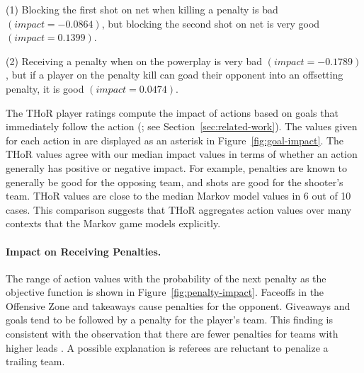 \documentclass[]{article}
\begin{document}
 (1) Blocking the first shot on net when killing a penalty is bad $(impact=-0.0864)$, but blocking the second shot on net is very good $(impact=0.1399)$.

 (2) Receiving a penalty when on the powerplay is very bad $(impact=-0.1789)$, but if a player on the penalty kill can goad their opponent into an offsetting penalty, it is good $(impact=0.0474)$.

The THoR player ratings compute the impact of actions based on goals that immediately follow the action (\citep{Lock2009,Schuckers2011}; see Section~\ref{sec:related-work}). The values given for each action in \citep{Lock2009} are displayed as an asterisk in Figure~\ref{fig:goal-impact}.
%
The THoR values
agree with our median impact values in terms of whether an action generally has positive or negative impact. For example, penalties are known to generally be good for the opposing team, and shots are good for the shooter's team. THoR values are close to the median Markov model values in 6 out of 10 cases.
This comparison suggests that THoR aggregates action values over many contexts that the Markov game models explicitly.

\paragraph{Impact on Receiving Penalties.}
The range of action values with the probability of the next penalty as the objective function is shown in Figure~\ref{fig:penalty-impact}.
Faceoffs in the Offensive Zone and takeaways cause penalties for the opponent. Giveaways and goals tend to be followed by a penalty for the player's team. This finding is consistent with the observation that there are fewer penalties for teams with higher leads \citep{Schuckers2012}. A possible explanation is referees are reluctant to penalize a trailing team.
\end{document}
